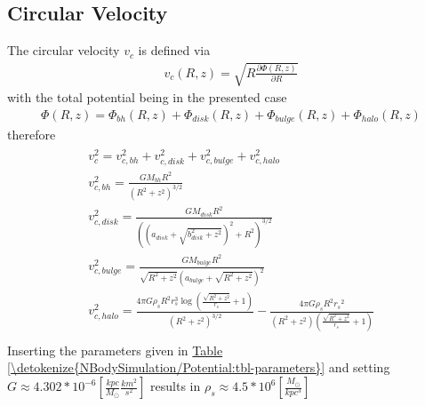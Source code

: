 \documentclass[letterpaper,10pt,english]{sphinxmanual}
\begin{document}
			\subsection{Circular Velocity}
				\label{\detokenize{NBodySimulation/Potential:circular-velocity}}
				\sphinxAtStartPar
				The circular velocity \(v_{c}\) is defined via
				\begin{equation}\label{equation:NBodySimulation/Potential:circular_velocity}
				\begin{split}v_{c}\left ( R,z \right ) = \sqrt{R\frac{\partial \Phi \left (R,z  \right )}{\partial R}   }\end{split}
				\end{equation}
				\sphinxAtStartPar
				with the total potential being in the presented case
				\begin{equation}\label{equation:NBodySimulation/Potential:total_potential}
				\begin{split}\Phi \left ( R,z \right ) = \Phi_{bh} \left ( R,z \right )+\Phi_{disk} \left ( R,z \right )+\Phi_{bulge} \left ( R,z \right )+\Phi_{halo} \left ( R,z \right )\end{split}
				\end{equation}
				\sphinxAtStartPar
				therefore
				\begin{align*}\!\begin{aligned}
				v_{c}^{2} = v_{c,bh}^{2}+v_{c,disk}^{2}+v_{c,bulge}^{2}+v_{c,halo}^{2}\\
				v_{c,bh}^{2} = \frac{G M_{bh} R^2}{\left(R^2+z^2\right)^{3/2}}\\
				v_{c,disk}^{2} = \frac{GM_{disk}R^2}{\left(\left(a_{disk}+\sqrt{b_{disk}^2+z^2}\right)^2+R^2\right)^{3/2}}\\
				v_{c,bulge}^{2} = \frac{G M_{bulge} R^2}{\sqrt{R^2+z^2} \left(a_{bulge}+\sqrt{R^2+z^2}\right)^2}\\
				v_{c,halo}^{2} = \frac{4 \pi G \rho _{s} R^2 r_{s}^3 \log \left(\frac{\sqrt{R^2+z^2}}{r_{s}}+1\right)}{\left(R^2+z^2\right)^{3/2}}-\frac{4\pi G\rho_{s} R^2 {r_{s}}^2}{\left(R^2+z^2\right) \left(\frac{\sqrt{R^2+z^2}}{r_{s}}+1\right)}\\
				\end{aligned}\end{align*}
				\sphinxAtStartPar
				Inserting the parameters given in \hyperref[\detokenize{NBodySimulation/Potential:tbl-parameters}]{Table \ref{\detokenize{NBodySimulation/Potential:tbl-parameters}}} and setting \(G\approx 4.302*10^{-6}\left [ \frac{kpc}{M_\odot}\frac{km^{2}}{s^{2}} \right ]\) results in \(\rho_{s}\approx 4.5*10^{6} \left [ \frac{M_\odot}{kpc^{3}} \right ]\)
				
\end{document}
